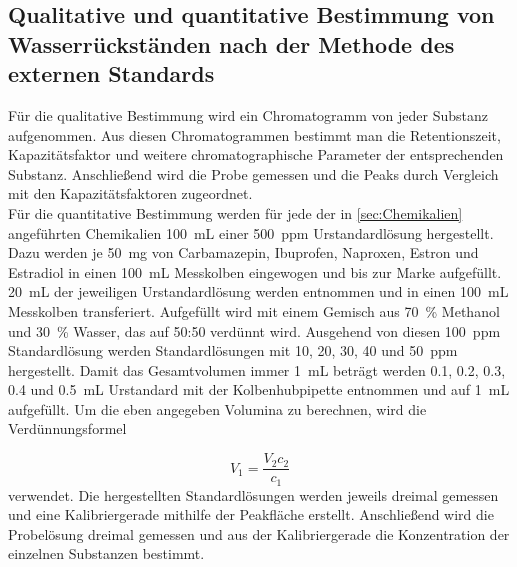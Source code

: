   \subsection{Qualitative und quantitative Bestimmung von Wasserrückständen nach der Methode des externen Standards}
    
    Für die qualitative Bestimmung wird ein Chromatogramm von jeder Substanz aufgenommen. Aus diesen Chromatogrammen bestimmt man die Retentionszeit, Kapazitätsfaktor und weitere chromatographische Parameter der entsprechenden Substanz. Anschließend wird die Probe gemessen und die Peaks durch Vergleich mit den Kapazitätsfaktoren zugeordnet. \\
    
    Für die quantitative Bestimmung werden für jede der in \ref{sec:Chemikalien} angeführten Chemikalien \SI[mode=text]{100}{\milli\liter} einer \SI[mode=text]{500}{ppm} Urstandardlösung hergestellt. Dazu werden je \SI[mode=text]{50}{\milli\gram} von Carbamazepin, Ibuprofen, Naproxen, Estron und Estradiol in einen \SI[mode=text]{100}{\milli\liter} Messkolben eingewogen und bis zur Marke aufgefüllt. \SI[mode=text]{20}{\milli\liter} der jeweiligen Urstandardlösung werden entnommen und in einen \SI[mode=text]{100}{\milli\liter} Messkolben transferiert. Aufgefüllt wird mit einem Gemisch aus \SI[mode=text]{70}{\percent} Methanol und \SI[mode=text]{30}{\percent} Wasser, das auf 50:50 verdünnt wird. Ausgehend von diesen \SI[mode=text]{100}{ppm} Standardlösung werden Standardlösungen mit 10, 20, 30, 40 und \SI[mode=text]{50}{ppm} hergestellt. Damit das Gesamtvolumen immer \SI[mode=text]{1}{\milli\liter} beträgt werden 0.1, 0.2, 0.3, 0.4 und \SI[mode=text]{0.5}{\milli\liter} Urstandard mit der Kolbenhubpipette entnommen und auf \SI[mode=text]{1}{\milli\liter} aufgefüllt. Um die eben angegeben Volumina zu berechnen, wird die Verdünnungsformel
    
      \begin{equation}
        V_1 = \frac{V_2 c_2}{c_1}
      \end{equation}  
    verwendet. Die hergestellten Standardlösungen werden jeweils dreimal gemessen und eine Kalibriergerade mithilfe der Peakfläche erstellt. Anschließend wird die Probelösung dreimal gemessen und  aus der Kalibriergerade die Konzentration der einzelnen Substanzen bestimmt. 
    
